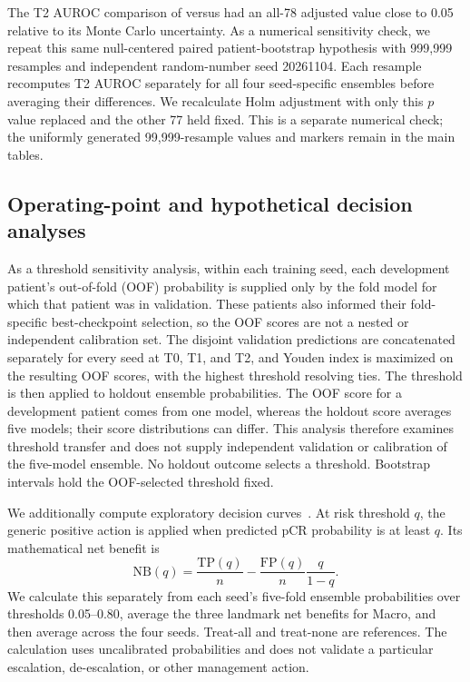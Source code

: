 The T2 AUROC comparison of \fullmodel{} versus \nojepa{} had an all-78 adjusted value close to 0.05 relative to its Monte Carlo uncertainty. As a numerical sensitivity check, we repeat this same null-centered paired patient-bootstrap hypothesis with 999,999 resamples and independent random-number seed 20261104. Each resample recomputes T2 AUROC separately for all four seed-specific ensembles before averaging their differences. We recalculate Holm adjustment with only this $p$ value replaced and the other 77 held fixed. This is a separate numerical check; the uniformly generated 99,999-resample values and markers remain in the main tables.

\subsection{Operating-point and hypothetical decision analyses}
As a threshold sensitivity analysis, within each training seed, each development patient's out-of-fold (OOF) probability is supplied only by the fold model for which that patient was in validation. These patients also informed their fold-specific best-checkpoint selection, so the OOF scores are not a nested or independent calibration set. The disjoint validation predictions are concatenated separately for every seed at T0, T1, and T2, and Youden index is maximized on the resulting OOF scores, with the highest threshold resolving ties. The threshold is then applied to holdout ensemble probabilities. The OOF score for a development patient comes from one model, whereas the holdout score averages five models; their score distributions can differ. This analysis therefore examines threshold transfer and does not supply independent validation or calibration of the five-model ensemble. No holdout outcome selects a threshold. Bootstrap intervals hold the OOF-selected threshold fixed.

We additionally compute exploratory decision curves~\citep{vickers2006dca}. At risk threshold $q$, the generic positive action is applied when predicted pCR probability is at least $q$. Its mathematical net benefit is
\begin{equation}
 \mathrm{NB}(q)=\frac{\mathrm{TP}(q)}{n}
 -\frac{\mathrm{FP}(q)}{n}\frac{q}{1-q}.
\end{equation}
We calculate this separately from each seed's five-fold ensemble probabilities over thresholds 0.05--0.80, average the three landmark net benefits for Macro, and then average across the four seeds. Treat-all and treat-none are references. The calculation uses uncalibrated probabilities and does not validate a particular escalation, de-escalation, or other management action.

